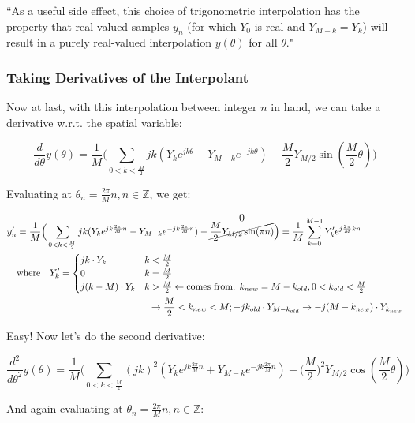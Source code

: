 \documentclass[10pt]{article}
\begin{document}
``As a useful side effect, this choice of trigonometric interpolation has the property that real-valued samples $y_n$ (for which $Y_0$ is real and $Y_{M-k} = \overline{Y_k}$) will result in a purely real-valued interpolation $y(\theta)$ for all $\theta$."

\subsubsection{Taking Derivatives of the Interpolant}

Now at last, with this interpolation between integer $n$ in hand, we can take a derivative w.r.t. the spatial variable:

$$\frac{d}{d\theta} y(\theta) = \frac{1}{M} \Big( \sum_{0 < k < \frac{M}{2}} j k (Y_k e^{j k \theta} - Y_{M-k} e^{-j k \theta}) - \frac{M}{2} Y_{M/2} \sin(\frac{M}{2}\theta) \Big)$$

Evaluating at $\theta_n = \frac{2\pi}{M}n, n \in \mathbb{Z}$, we get:

\begin{align*}
y'_n &= \frac{1}{M} \Big( \sum_{0 < k < \frac{M}{2}} j k (Y_k e^{j k \frac{2\pi}{M}n} - Y_{M-k} e^{-j k \frac{2\pi}{M}n}) - \overset{\text{\large 0}}{\cancel{\frac{M}{2} Y_{M/2} \sin(\pi n)}} \Big) = \frac{1}{M} \sum_{k = 0}^{M-1} Y'_k e^{j\frac{2\pi}{M}kn} \\
& \text{where} \quad Y'_k = \begin{cases} j k \cdot Y_k & k < \frac{M}{2} \\ 0 & k = \frac{M}{2} \\ j(k - M) \cdot Y_k & k > \frac{M}{2} \leftarrow \text{comes from: } k_{new} = M - k_{old}, 0 < k_{old} < \frac{M}{2} \end{cases}\\ & \hspace{5cm} \rightarrow \frac{M}{2} < k_{new} < M; -jk_{old} \cdot Y_{M - k_{old}} \rightarrow -j(M - k_{new}) \cdot Y_{k_{new}}
\end{align*}

Easy! Now let's do the second derivative:

$$\frac{d^2}{d\theta^2} y(\theta) = \frac{1}{M} \Big( \sum_{0 < k < \frac{M}{2}} (jk)^2 (Y_k e^{j k \frac{2\pi}{M}n} + Y_{M-k} e^{-j k \frac{2\pi}{M}n}) - \Big(\frac{M}{2}\Big)^2 Y_{M/2} \cos(\frac{M}{2}\theta) \Big)$$

And again evaluating at $\theta_n = \frac{2\pi}{M}n, n \in \mathbb{Z}$:
\end{document}
